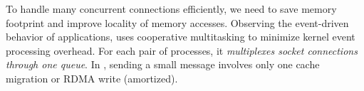

To handle many concurrent connections efficiently, we need to save memory footprint and improve locality of memory accesses. Observing the event-driven behavior of applications, \sys uses cooperative multitasking to minimize kernel event processing overhead. For each pair of processes, it \textit{multiplexes socket connections through one queue}. In \sys, sending a small message involves only one cache migration or RDMA write (amortized).



